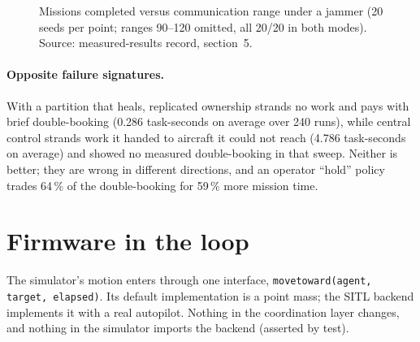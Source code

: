 \documentclass[a4paper,11pt]{article}
\newcommand{\code}[1]{\texttt{\codebreaks#1\endcodebreaks}}
\def\codebreaks{\begingroup\def\_{\textunderscore\allowbreak}\def\/{/\allowbreak}}
\def\endcodebreaks{\endgroup}
\begin{document}
\begin{figure}[t]
\centering
{}
\caption{Missions completed versus communication range under a jammer
(20 seeds per point; ranges 90--120 omitted, all 20/20 in both modes).
Source: measured-results record, section~5.}
\label{fig:range}
\end{figure}

\paragraph{Opposite failure signatures.} With a partition that heals, replicated
ownership strands no work and pays with brief double-booking (0.286
task-seconds on average over 240 runs), while central control strands work it
handed to aircraft it could not reach (4.786 task-seconds on average) and showed
no measured double-booking in that sweep. Neither is better; they are wrong in
different directions, and an operator ``hold'' policy trades 64\,\% of the
double-booking for 59\,\% more mission time.

\section{Firmware in the loop}\label{sec:sitl}

The simulator's motion enters through one interface,
\code{move\_toward(agent, target, elapsed)}. Its default implementation is a
point mass; the SITL backend implements it with a real autopilot. Nothing in
the coordination layer changes, and nothing in the simulator imports the
backend (asserted by test).
\end{document}
